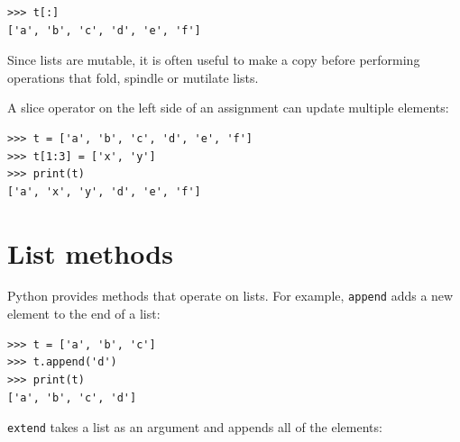 \documentclass[10pt]{book}
\begin{document}

\beforeverb
\begin{verbatim}
>>> t[:]
['a', 'b', 'c', 'd', 'e', 'f']
\end{verbatim}
\afterverb
%
Since lists are mutable, it is often useful to make a copy
before performing operations that fold, spindle or mutilate
lists.


A slice operator on the left side of an assignment
can update multiple elements:


\beforeverb
\begin{verbatim}
>>> t = ['a', 'b', 'c', 'd', 'e', 'f']
>>> t[1:3] = ['x', 'y']
>>> print(t)
['a', 'x', 'y', 'd', 'e', 'f']
\end{verbatim}
\afterverb
%


%

%


\section{List methods}


Python provides methods that operate on lists.  For example,
{\tt append} adds a new element to the end of a list:


\beforeverb
\begin{verbatim}
>>> t = ['a', 'b', 'c']
>>> t.append('d')
>>> print(t)
['a', 'b', 'c', 'd']
\end{verbatim}
\afterverb
%
{\tt extend} takes a list as an argument and appends all of
the elements:
\end{document}
